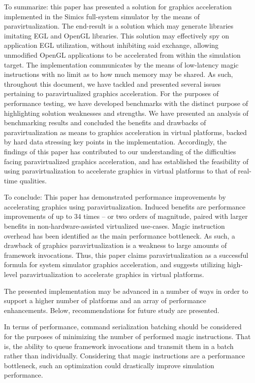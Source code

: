 To summarize: this paper has presented a solution for graphics acceleration implemented in the Simics full-system simulator by the means of paravirtualization.
The end-result is a solution which may generate libraries imitating EGL and OpenGL libraries.
This solution may effectively spy on application EGL utilization, without inhibiting said exchange, allowing unmodified OpenGL applications to be accelerated from within the simulation target.
The implementation communicates by the means of low-latency magic instructions with no limit as to how much memory may be shared.
As such, throughout this document, we have tackled and presented several issues pertaining to paravirtualized graphics acceleration.
For the purposes of performance testing, we have developed benchmarks with the distinct purpose of highlighting solution weaknesses and strengths.
We have presented an analysis of benchmarking results and concluded the benefits and drawbacks of paravirtualization as means to graphics acceleration in virtual platforms, backed by hard data stressing key points in the implementation.
Accordingly, the findings of this paper has contributed to our understanding of the difficulties facing paravirtualized graphics acceleration, and has established the feasibility of using paravirtualization to accelerate graphics in virtual platforms to that of real-time qualities.

To conclude: This paper has demonstrated performance improvements by accelerating graphics using paravirtualization.
Induced benefits are performance improvements of up to $34$ times -- or two orders of magnitude, paired with larger benefits in non-hardware-assisted virtualized use-cases.
Magic instruction overhead has been identified as the main performance bottleneck.
As such, a drawback of graphics paravirtualization is a weakness to large amounts of framework invocations.
Thus, this paper claims paravirtualization as a successful formula for system simulator graphics acceleration, and suggests utilizing high-level paravirtualization to accelerate graphics in virtual platforms.

The presented implementation may be advanced in a number of ways in order to support a higher number of platforms and an array of performance enhancements.
Below, recommendations for future study are presented.

In terms of performance, command serialization batching should be considered for the purposes of minimizing the number of performed magic instructions.
That is, the ability to queue framework invocations and transmit them in a batch rather than individually.
Considering that magic instructions are a performance bottleneck, such an optimization could drastically improve simulation performance.

